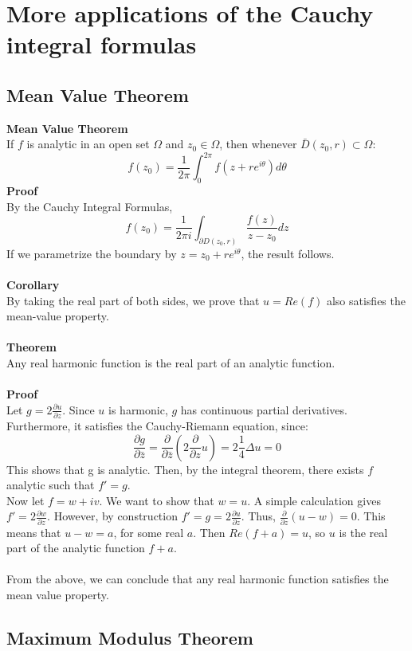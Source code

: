 \documentclass[12 pt]{article}
\begin{document}
\section{More applications of the Cauchy integral formulas}
\subsection{Mean Value Theorem} 
\textbf{Mean Value Theorem}
\\
If $f$ is analytic in an open set $\Omega$ and $z_0\in \Omega$, then whenever $\bar D (z_0,r) \subset \Omega$:
\[ f(z_0) = \frac{1}{2\pi} \int^{2\pi}_0 f(z+r e^{i\theta}) d\theta \]
\textbf{Proof}
\\
By the Cauchy Integral Formulas,
\[ f(z_0) = \frac{1}{2\pi i} \int_{\partial D(z_0,r)} \frac{f(z)}{z-z_0} dz \]
If we parametrize the boundary by $z=z_0+r e^{i\theta}$, the result follows.
\\
\\
\textbf{Corollary}
\\
By taking the real part of both sides, we prove that $ u = Re(f)$ also satisfies the mean-value property.
\\
\\
\textbf{Theorem}
\\
Any real harmonic function is the real part of an analytic function.
\\
\\
\textbf{Proof}
\\
Let $g = 2 \frac{\partial u}{\partial z} $. Since $u$ is harmonic, $g$ has continuous partial derivatives. Furthermore, it satisfies the Cauchy-Riemann equation, since:
\[ \frac{\partial g}{\partial \bar z} = \frac{\partial}{\partial \bar z} (2 \frac{\partial}{\partial z}u ) = 2 \frac{1}{4} \Delta u = 0 \]
This shows that g is analytic. Then, by the integral theorem, there exists $f$ analytic such that $ f' = g$.
\\
 Now let $f = w + iv$. We want to show that $w=u$. A simple calculation gives $ f' = 2 \frac{\partial w}{\partial z} $. However, by construction $ f' = g =  2 \frac{\partial u}{\partial z} $. Thus, $ \frac{\partial}{\partial z} (u-w) = 0 $. This means that $ u - w = a$, for some real $a$. Then $Re(f+a) = u$, so $u$ is the real part of the analytic function $ f+a$.
\\
\\
From the above, we can conclude that any real harmonic function satisfies the mean value property.

\subsection{Maximum Modulus Theorem}
\end{document}
